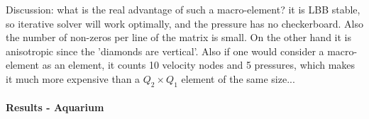 Discussion: what is the real advantage of such a macro-element? it is LBB stable, so 
iterative solver will work optimally, and the pressure has no checkerboard. 
Also the number of non-zeros per line of the matrix is small.  
On the other hand it is anisotropic since the 'diamonds are vertical'. 
Also if one would consider a macro-element as an element, it counts 10 velocity nodes and 5 pressures, 
which makes it much more expensive than a $Q_2\times Q_1$ element of the same size...






\newpage
\paragraph{Results - Aquarium}

